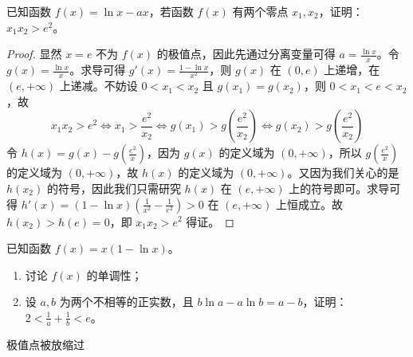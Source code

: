 \begin{example}
    已知函数 $f(x) = \ln x - ax$，若函数 $f(x)$ 有两个零点 $x_1, x_2$，证明：$x_1 x_2 > e^2$。
\end{example}

\begin{proof}
    显然 $x = e$ 不为 $f(x)$ 的极值点，因此先通过分离变量可得 $a = \frac{\ln x}{x}$。令 $g(x) = \frac{\ln x}{x}$。求导可得 $g'(x) = \frac{1 - \ln x}{x^2}$，则 $g(x)$ 在 $(0, e)$ 上递增，在 $(e, +\infty)$ 上递减。不妨设 $0 < x_1 < x_2$ 且 $g(x_1) = g(x_2)$，则 $0 < x_1 < e < x_2$，故
\[
x_1 x_2 > e^2 \Leftrightarrow x_1 > \frac{e^2}{x_2} \Leftrightarrow g(x_1) > g\left(\frac{e^2}{x_2}\right) \Leftrightarrow g(x_2) > g\left(\frac{e^2}{x_2}\right)
\]
令 $h(x) = g(x) - g\left(\frac{e^2}{x}\right)$，因为 $g(x)$ 的定义域为 $(0, +\infty)$，所以 $g\left(\frac{e^2}{x}\right)$ 的定义域为 $(0, +\infty)$，故 $h(x)$ 的定义域为 $(0, +\infty)$。又因为我们关心的是 $h(x_2)$ 的符号，因此我们只需研究 $h(x)$ 在 $(e, +\infty)$ 上的符号即可。求导可得 $h'(x) = (1 - \ln x)\left(\frac{1}{x^2} - \frac{1}{e^2}\right) > 0$ 在 $(e, +\infty)$ 上恒成立。故 $h(x_2) > h(e) = 0$，即 $x_1 x_2 > e^2$ 得证。
\end{proof}

\begin{example}[2021年新高考I卷]
    已知函数 $f(x) = x(1 - \ln x)$。

\begin{enumerate}
    \item 讨论 $f(x)$ 的单调性；
    \item 设 $a, b$ 为两个不相等的正实数，且 $b \ln a - a \ln b = a - b$，证明：$2 < \frac{1}{a} + \frac{1}{b} < e$。
\end{enumerate}

\end{example}
\begin{jie}
    
\end{jie}


极值点被放缩过

